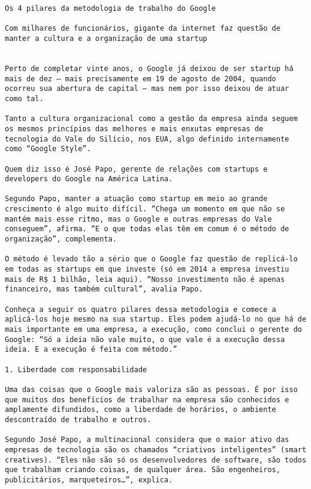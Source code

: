 \begin{verbatim}
Os 4 pilares da metodologia de trabalho do Google

Com milhares de funcionários, gigante da internet faz questão de
manter a cultura e a organização de uma startup


Perto de completar vinte anos, o Google já deixou de ser startup há
mais de dez – mais precisamente em 19 de agosto de 2004, quando
ocorreu sua abertura de capital – mas nem por isso deixou de atuar
como tal.

Tanto a cultura organizacional como a gestão da empresa ainda seguem
os mesmos princípios das melhores e mais enxutas empresas de
tecnologia do Vale do Silício, nos EUA, algo definido internamente
como “Google Style”.

Quem diz isso é José Papo, gerente de relações com startups e
developers do Google na América Latina.

Segundo Papo, manter a atuação como startup em meio ao grande
crescimento é algo muito difícil. “Chega um momento em que não se
mantém mais esse ritmo, mas o Google e outras empresas do Vale
conseguem”, afirma. “E o que todas elas têm em comum é o método de
organização”, complementa.

O método é levado tão a sério que o Google faz questão de replicá-lo
em todas as startups em que investe (só em 2014 a empresa investiu
mais de R$ 1 bilhão, leia aqui). “Nosso investimento não é apenas
financeiro, mas também cultural”, avalia Papo.

Conheça a seguir os quatro pilares dessa metodologia e comece a
aplicá-los hoje mesmo na sua startup. Eles podem ajudá-lo no que há de
mais importante em uma empresa, a execução, como conclui o gerente do
Google: “Só a ideia não vale muito, o que vale é a execução dessa
ideia. E a execução é feita com método.”

1. Liberdade com responsabilidade

Uma das coisas que o Google mais valoriza são as pessoas. É por isso
que muitos dos benefícios de trabalhar na empresa são conhecidos e
amplamente difundidos, como a liberdade de horários, o ambiente
descontraído de trabalho e outros.

Segundo José Papo, a multinacional considera que o maior ativo das
empresas de tecnologia são os chamados “criativos inteligentes” (smart
creatives). “Eles não são só os desenvolvedores de software, são todos
que trabalham criando coisas, de qualquer área. São engenheiros,
publicitários, marqueteiros…”, explica.


\end{verbatim}
